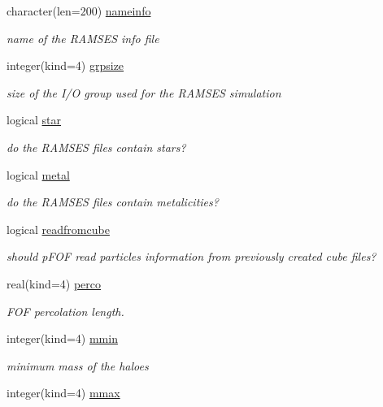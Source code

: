 \begin{DoxyCompactItemize}
character(len=200) \hyperlink{classmodparameters_a755742d02a709ed5c570a3f380604fbb}{nameinfo}
\begin{DoxyCompactList}\small\item\em name of the R\-A\-M\-S\-E\-S info file \end{DoxyCompactList}\item 
integer(kind=4) \hyperlink{classmodparameters_a6a42cee2694995ca6ca39decb47a6303}{grpsize}
\begin{DoxyCompactList}\small\item\em size of the I/\-O group used for the R\-A\-M\-S\-E\-S simulation \end{DoxyCompactList}\item 
logical \hyperlink{classmodparameters_a5c425cedc8a349e31a559939e8887419}{star}
\begin{DoxyCompactList}\small\item\em do the R\-A\-M\-S\-E\-S files contain stars? \end{DoxyCompactList}\item 
logical \hyperlink{classmodparameters_a354e77e79b0b7309df87f45c994adea8}{metal}
\begin{DoxyCompactList}\small\item\em do the R\-A\-M\-S\-E\-S files contain metalicities? \end{DoxyCompactList}\item 
logical \hyperlink{classmodparameters_aef43d9e55952a11ab38b7ec4b793eeee}{readfromcube}
\begin{DoxyCompactList}\small\item\em should p\-F\-O\-F read particles information from previously created cube files? \end{DoxyCompactList}\item 
real(kind=4) \hyperlink{classmodparameters_a555c497cb7980e89a34876df62f2b22b}{perco}
\begin{DoxyCompactList}\small\item\em F\-O\-F percolation length. \end{DoxyCompactList}\item 
integer(kind=4) \hyperlink{classmodparameters_a4f5bb13705cae2bfb6255cf7b498aacc}{mmin}
\begin{DoxyCompactList}\small\item\em minimum mass of the haloes \end{DoxyCompactList}\item 
integer(kind=4) \hyperlink{classmodparameters_a1dc1488fae7094ded9408953a21ada2f}{mmax}

\end{DoxyCompactItemize}
